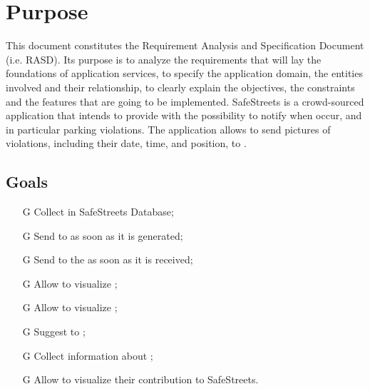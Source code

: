 \documentclass[../../rasd.tex]{subfiles}
\begin{document}
\section{Purpose\label{sect:1.1}}

This document constitutes the Requirement Analysis and Specification Document (i.e. RASD). Its purpose is to analyze the requirements that will lay the foundations of application services, to specify the application domain, the entities involved and their relationship, to clearly explain the objectives, the constraints and the features that are going to be implemented. \newline
SafeStreets is a crowd-sourced application that intends to provide  with the possibility to notify  when  occur, and in particular parking violations. The application allows  to send pictures of violations, including their date, time, and position, to .
			
\subsection{Goals\label{sect:1.1.1}}

\begin{itemize}
		\item[G\subs{1}]Collect  in SafeStreets Database;
		\item[G\subs{2}]Send  to  as soon as it is generated;
		\item[G\subs{3}]Send  to the  as soon as it is received;
		\item[G\subs{4}]Allow  to visualize ;
		\item[G\subs{5}]Allow  to visualize ;
		\item[G\subs{6}]Suggest  to ;
		\item[G\subs{7}]Collect information about ;
		\item[G\subs{8}]Allow  to visualize their contribution to SafeStreets.
\end{itemize}
\end{document}

